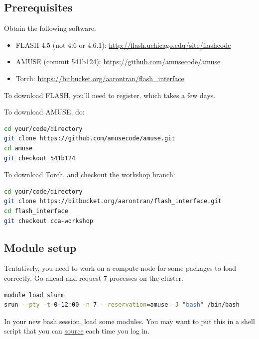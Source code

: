 \documentclass[10pt]{article}
\begin{document}
\subsection{Prerequisites}

Obtain the following software.
\begin{itemize}
\item FLASH 4.5 (not 4.6 or 4.6.1):
    \url{http://flash.uchicago.edu/site/flashcode}
\item AMUSE (commit 541b124): \url{https://github.com/amusecode/amuse}
\item Torch: \url{https://bitbucket.org/aarontran/flash\_interface}
\end{itemize}

To download FLASH, you'll need to register, which takes a few days.

To download AMUSE, do:
\begin{lstlisting}[language=bash]
cd your/code/directory
git clone https://github.com/amusecode/amuse.git
cd amuse
git checkout 541b124
\end{lstlisting}

To download Torch, and checkout the workshop branch:
\begin{lstlisting}[language=bash]
cd your/code/directory
git clone https://bitbucket.org/aarontran/flash_interface.git
cd flash_interface
git checkout cca-workshop
\end{lstlisting}

\subsection{Module setup}

Tentatively, you need to work on a compute node for some packages to load
correctly.  Go ahead and request 7 processes on the cluster.
\begin{lstlisting}[language=bash]
module load slurm
srun --pty -t 0-12:00 -n 7 --reservation=amuse -J "bash" /bin/bash
\end{lstlisting}

In your new bash session, load some modules.  You may want to put this in a
shell script that you can
\href{https://en.wikipedia.org/wiki/Source_(command)}{source}
each time you log in.
\end{document}
